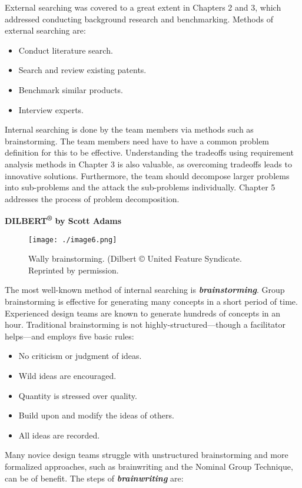 External searching was covered to a great extent in Chapters 2 and 3,
which addressed conducting background research and benchmarking. Methods
of external searching are:

\begin{itemize}
\item
  Conduct literature search.
\item
  Search and review existing patents.
\item
  Benchmark similar products.
\item
  Interview experts.
\end{itemize}

Internal searching is done by the team members via methods such as
brainstorming. The team members need have to have a common problem
definition for this to be effective. Understanding the tradeoffs using
requirement analysis methods in Chapter 3 is also valuable, as
overcoming tradeoffs leads to innovative solutions. Furthermore, the
team should decompose larger problems into sub-problems and the attack
the sub-problems individually. Chapter 5 addresses the process of
problem decomposition.

\textbf{DILBERT\textsuperscript{®} by Scott Adams}
\begin{figure}
\texttt{[image: ./image6.png]}
\caption{Wally brainstorming. (Dilbert © United
Feature Syndicate. Reprinted by permission.}
\label{figure:dilbertConcept}
\end{figure}

The most well-known method of internal searching is
\emph{\textbf{brainstorming}}. Group brainstorming is effective for
generating many concepts in a short period of time. Experienced design
teams are known to generate hundreds of concepts in an hour. Traditional
brainstorming is not highly-structured---though a facilitator
helps---and employs five basic rules:

\begin{itemize}
\item
  No criticism or judgment of ideas.
\item
  Wild ideas are encouraged.
\item
  Quantity is stressed over quality.
\item
  Build upon and modify the ideas of others.
\item
  All ideas are recorded.
\end{itemize}

Many novice design teams struggle with unstructured brainstorming and
more formalized approaches, such as brainwriting and the Nominal Group
Technique, can be of benefit. The steps of \emph{\textbf{brainwriting}}
are:

